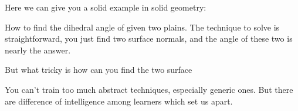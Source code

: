 Here we can give you a solid example in solid geometry:

How to find the dihedral angle of given two plains. The technique to solve is straightforward, you just find two surface normals, and the angle of these two is nearly the answer.

But what tricky is how can you find the two surface


You can't train too much abstract techniques, especially generic ones. But there are difference of intelligence among learners which set us apart.
